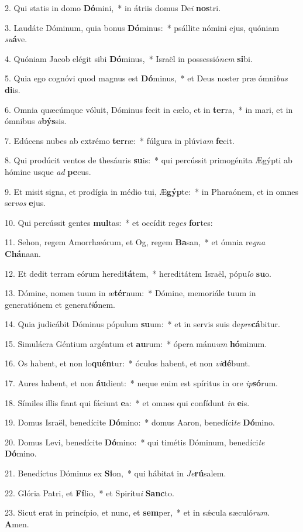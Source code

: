 2. Qui statis in domo \textbf{Dó}mini,~*  in átriis domus De\textit{i} \textbf{nos}tri.\

3. Laudáte Dóminum, quia bonus \textbf{Dó}minus:~*  psállite nómini ejus, quóniam \textit{su}\textbf{á}ve.\

4. Quóniam Jacob elégit sibi \textbf{Dó}minus,~*  Israël in possessió\textit{nem} \textbf{si}bi.\

5. Quia ego cognóvi quod magnus est \textbf{Dó}minus,~*  et Deus noster præ ómni\textit{bus} \textbf{di}is.\

6. Omnia quæcúmque vóluit, Dóminus fecit in cælo, et in \textbf{ter}ra,~*  in mari, et in ómnibus \textit{a}\textbf{býs}sis.\

7. Edúcens nubes ab extrémo \textbf{ter}ræ:~*  fúlgura in plúvi\textit{am} \textbf{fe}cit.\

8. Qui prodúcit ventos de thesáuris \textbf{su}is:~*  qui percússit primogénita Ægýpti ab hómine usque \textit{ad} \textbf{pe}cus.\

9. Et misit signa, et prodígia in médio tui, Æ\textbf{gýp}te:~*  in Pharaónem, et in omnes ser\textit{vos} \textbf{e}jus.\

10. Qui percússit gentes \textbf{mul}tas:~*  et occídit re\textit{ges} \textbf{for}tes:\

11. Sehon, regem Amorrhæórum, et Og, regem \textbf{Ba}san,~*  et ómnia re\textit{gna} \textbf{Chá}naan.\

12. Et dedit terram eórum heredi\textbf{tá}tem,~*  hereditátem Israël, pópu\textit{lo} \textbf{su}o.\

13. Dómine, nomen tuum in æ\textbf{tér}num:~*  Dómine, memoriále tuum in generatiónem et genera\textit{ti}\textbf{ó}nem.\

14. Quia judicábit Dóminus pópulum \textbf{su}um:~*  et in servis suis de\textit{pre}\textbf{cá}bitur.\

15. Simulácra Géntium argéntum et \textbf{au}rum:~*  ópera mánu\textit{um} \textbf{hó}minum.\

16. Os habent, et non lo\textbf{quén}tur:~*  óculos habent, et non \textit{vi}\textbf{dé}bunt.\

17. Aures habent, et non \textbf{áu}dient:~*  neque enim est spíritus in ore \textit{ip}\textbf{só}rum.\

18. Símiles illis fiant qui fáciunt \textbf{e}a:~*  et omnes qui confídunt \textit{in} \textbf{e}is.\

19. Domus Israël, benedícite \textbf{Dó}mino:~*  domus Aaron, benedíci\textit{te} \textbf{Dó}mino.\

20. Domus Levi, benedícite \textbf{Dó}mino:~*  qui timétis Dóminum, benedíci\textit{te} \textbf{Dó}mino.\

21. Benedíctus Dóminus ex \textbf{Si}on,~*  qui hábitat in \textit{Je}\textbf{rú}salem.\

22. Glória Patri, et \textbf{Fí}lio,~*  et Spirítu\textit{i} \textbf{Sanc}to.\

23. Sicut erat in princípio, et nunc, et \textbf{sem}per,~*  et in sǽcula sæculó\textit{rum}. \textbf{A}men.\

